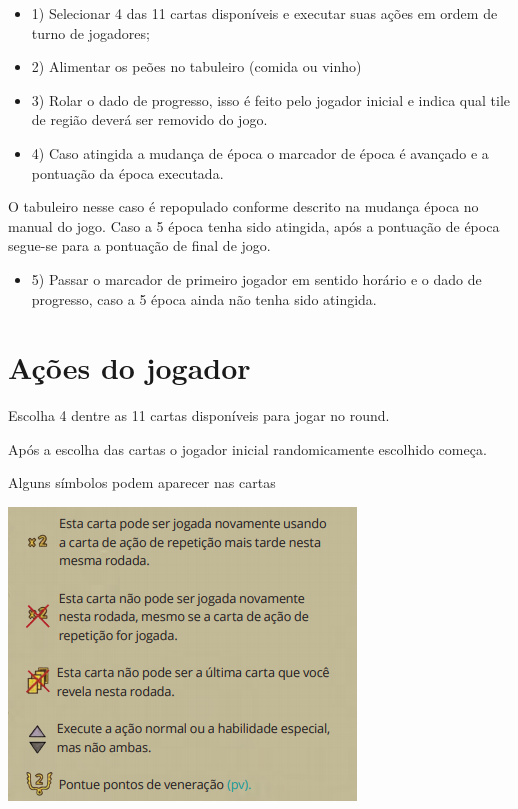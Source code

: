 \documentclass[11pt]{article}
\begin{document}
\begin{itemize}
\item 1) Selecionar 4 das 11 cartas disponíveis e executar suas ações em ordem de turno de jogadores;
\item 2) Alimentar os peões no tabuleiro (comida ou vinho)
\item 3) Rolar o dado de progresso, isso é feito pelo jogador inicial e indica qual tile de região deverá ser removido do jogo.
\item 4) Caso atingida a mudança de época o marcador de época é avançado e a pontuação da época executada.
\end{itemize}
O tabuleiro nesse caso é repopulado conforme descrito na mudança época no manual do jogo. Caso a 5 época tenha sido atingida, após a pontuação de época segue-se para a pontuação de final de jogo.
\begin{itemize}
\item 5) Passar o marcador de primeiro jogador em sentido horário e o dado de progresso, caso a 5 época ainda não tenha sido atingida.
\end{itemize}

\section{Ações do jogador}
\label{sec:orgheadline7}

Escolha 4 dentre as 11 cartas disponíveis para jogar no round.

Após a escolha das cartas o jogador inicial randomicamente escolhido começa.

Alguns símbolos podem aparecer nas cartas

\includegraphics[width=.9\linewidth]{./img/symbol.png}
\end{document}
